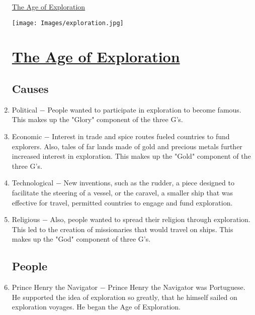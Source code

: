 \documentclass[12pt]{article}
\begin{document}
\begin{enumerate}
\newpage
\begin{center}
\end{center}
\begin{center}
\end{center}
\begin{center}
\underline{\Huge The Age of Exploration}
\end{center}
\vspace{50pt}
\texttt{[image: Images/exploration.jpg]}
\newpage

\begin{center}
\section{\underline{The Age of Exploration}}
\end{center}

\subsection{Causes}

\item Political $-$ People wanted to participate in exploration to become famous. This makes up the "Glory" component of the three G's.   

\item Economic $-$ Interest in trade and spice routes fueled countries to fund explorers. Also, tales of far lands made of gold and precious metals further increased interest in exploration. This makes up the "Gold" component of the three G's.

\item Technological $-$ New inventions, such as the rudder, a piece designed to facilitate the steering of a vessel, or the caravel, a smaller ship that was effective for travel, permitted countries to engage and fund exploration.

\item Religious $-$ Also, people wanted to spread their religion through exploration. This led to the creation of missionaries that would travel on ships. This makes up the "God" component of three G's.

\subsection{People}

\item Prince Henry the Navigator $-$ Prince Henry the Navigator was Portuguese. He supported the idea of exploration so greatly, that he himself sailed on exploration voyages. He began the Age of Exploration. 


\end{enumerate}
\end{document}
